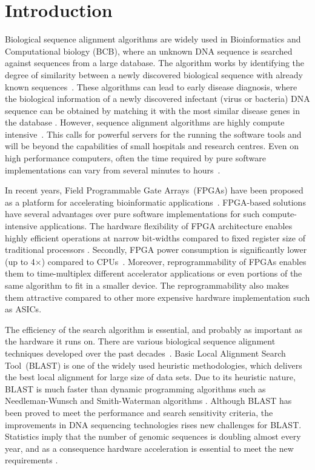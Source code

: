 \section{Introduction}
\label{sec:introduction}

Biological sequence alignment algorithms are widely used in Bioinformatics and Computational biology (BCB), where an unknown DNA sequence is searched against sequences from a large database. 
The algorithm works by identifying the degree of similarity between a newly discovered biological sequence with already known sequences~\cite{kasap2008design}.
These algorithms can lead to early disease diagnosis, where the biological information of a newly discovered infectant (virus or bacteria) DNA sequence can be obtained by matching it with the most similar disease genes in the database \cite{guo2012systolic}. 
However, sequence alignment algorithms are highly compute intensive~\cite{datta2009}. 
This calls for powerful servers for the running the software tools and will be beyond the capabilities of small hospitals and research centres.
Even on high performance computers, often the time required by pure software implementations can vary from several minutes to hours~\cite{masato2016}.  

In recent years, Field Programmable Gate Arrays~(FPGAs) have been proposed as a platform for accelerating bioinformatic applications~\cite{kasap2008design}. 
FPGA-based solutions have several advantages over pure software implementations for such compute-intensive applications.
The hardware flexibility of FPGA architecture enables highly efficient operations at narrow bit-widths compared to fixed register size of traditional processors \cite{cug2007}. 
Secondly, FPGA power consumption is significantly lower (up to 4$\times$) compared to CPUs~\cite{cug2007}. 
Moreover, reprogrammability of FPGAs enables them to time-multiplex different accelerator applications or even portions of the same algorithm to fit in a smaller device. 
The reprogrammability also makes them attractive compared to other more expensive hardware implementation such as ASICs. 

The efficiency of the search algorithm is essential, and probably as important as the hardware it runs on. 
There are various biological sequence alignment techniques developed over the past decades~\cite{mohd2013}. 
Basic Local Alignment Search Tool~(BLAST) is one of the widely used heuristic methodologies, which delivers the best local alignment for large size of data sets. 
Due to its heuristic nature, BLAST is much faster than dynamic programming algorithms such as Needleman-Wunsch and Smith-Waterman algorithms \cite{wien2011blastp}. 
Although BLAST has been proved to meet the performance and search sensitivity criteria, the improvements in DNA sequencing technologies rises new challenges for BLAST. 
Statistics imply that the number of genomic sequences is doubling almost every year, and as a consequence hardware acceleration is essential to meet the new requirements \cite{wien2011blastp}. 

